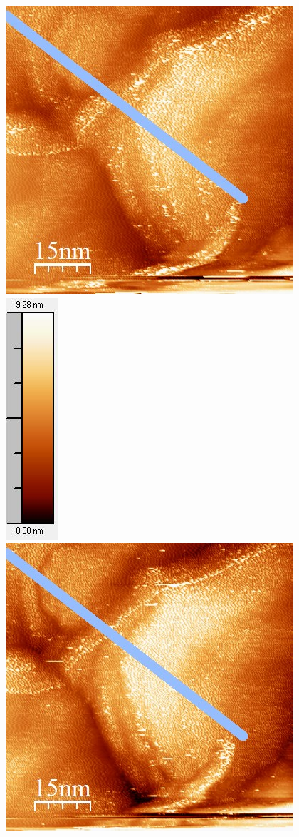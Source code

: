 \documentclass[12pt,a4paper]{article}
\begin{document}
\begin{figure}
\centering
\includegraphics[scale=0.6]{Bilder/Anhang/IGain/8000_IGain_vor.jpg}
\includegraphics[scale=0.6]{Bilder/Anhang/IGain/8000_IGain_vor_Skala.jpg}
\includegraphics[scale=0.6]{Bilder/Anhang/IGain/8000_IGain_nach.jpg}

\end{figure}
\end{document}
